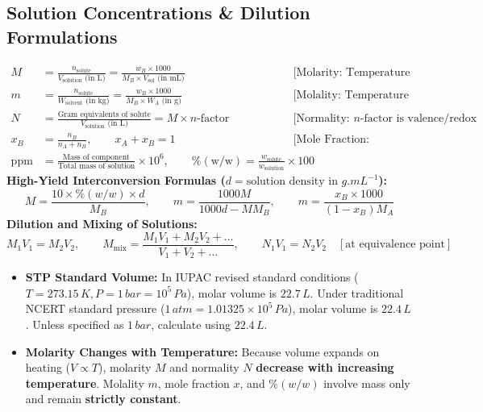 \documentclass[11pt,a4paper]{article}
\begin{document}
\subsection{Solution Concentrations \& Dilution Formulations}

\begin{formulabox}
\begin{align}
  M &= \frac{n_{\text{solute}}}{V_{\text{solution}}\text{ (in L)}} = \frac{w_B \times 1000}{M_B \times V_{\text{sol}}\text{ (in mL)}} && \text{[Molarity: Temperature Dependent]} \\
  m &= \frac{n_{\text{solute}}}{W_{\text{solvent}}\text{ (in kg)}} = \frac{w_B \times 1000}{M_B \times W_A\text{ (in g)}} && \text{[Molality: Temperature Independent]} \\
  N &= \frac{\text{Gram equivalents of solute}}{V_{\text{solution}}\text{ (in L)}} = M \times n\text{-factor} && \text{[Normality: } n\text{-factor is valence/redox exchange]} \\
  x_B &= \frac{n_B}{n_A + n_B}, \qquad x_A + x_B = 1 && \text{[Mole Fraction: Temperature Independent]} \\
  \text{ppm} &= \frac{\text{Mass of component}}{\text{Total mass of solution}} \times 10^6, \qquad \%(\text{w/w}) = \frac{w_{\text{solute}}}{w_{\text{solution}}} \times 100
\end{align}
\textbf{High-Yield Interconversion Formulas ($d = \text{solution density in }\si{g.mL^{-1}}$):}
\begin{equation}
  M = \frac{10 \times \%(w/w) \times d}{M_B}, \qquad m = \frac{1000 M}{1000 d - M M_B}, \qquad m = \frac{x_B \times 1000}{(1 - x_B)M_A}
\end{equation}
\textbf{Dilution and Mixing of Solutions:}
\begin{equation}
  M_1 V_1 = M_2 V_2, \qquad M_{\text{mix}} = \frac{M_1 V_1 + M_2 V_2 + \dots}{V_1 + V_2 + \dots}, \qquad N_1 V_1 = N_2 V_2 \quad [\text{at equivalence point}]
\end{equation}
\end{formulabox}

\begin{trapbox}
\begin{itemize}
  \item \textbf{STP Standard Volume:} In IUPAC revised standard conditions ($T = 273.15\,\si{K}, P = 1\,\si{bar} = 10^5\,\si{Pa}$), molar volume is $22.7\,\si{L}$. Under traditional NCERT standard pressure ($1\,\si{atm} = 1.01325\times 10^5\,\si{Pa}$), molar volume is $22.4\,\si{L}$. Unless specified as $1\,\si{bar}$, calculate using $22.4\,\si{L}$.
  \item \textbf{Molarity Changes with Temperature:} Because volume expands on heating ($V \propto T$), molarity $M$ and normality $N$ \textbf{decrease with increasing temperature}. Molality $m$, mole fraction $x$, and $\%(w/w)$ involve mass only and remain \textbf{strictly constant}.
\end{itemize}
\end{trapbox}
\end{document}
